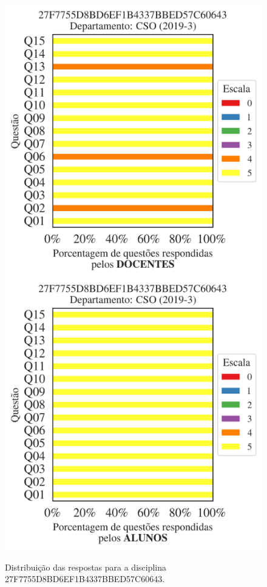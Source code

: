 \documentclass[a4paper,10pt]{article}
\begin{document}
\begin{figure}[h]
\centering
\includegraphics[width=0.485\linewidth]{analise_disciplina_departamento_CSO_27F7755D8BD6EF1B4337BBED57C60643_docentes.png}
\includegraphics[width=0.485\linewidth]{analise_disciplina_departamento_CSO_27F7755D8BD6EF1B4337BBED57C60643_alunos.png}
\caption{\label{fig:analise_geral_departamento}                Distribuição das respostas para a disciplina 27F7755D8BD6EF1B4337BBED57C60643. }
\end{figure}
\end{document}
